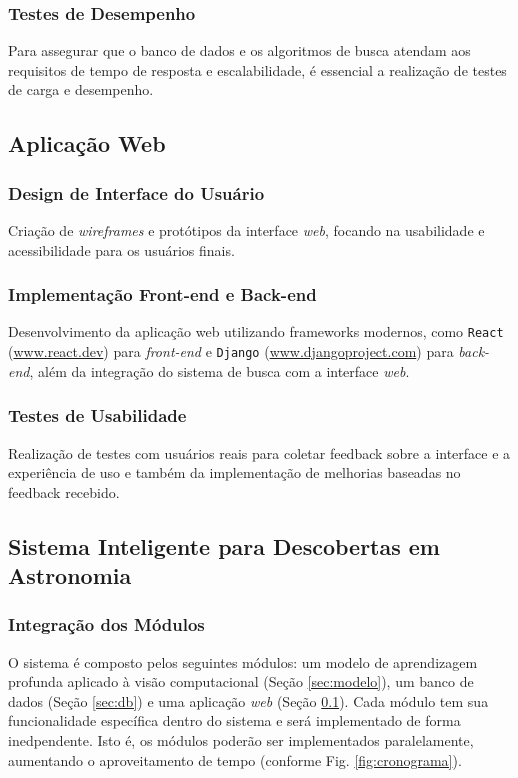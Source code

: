 \documentclass[a4,12pt]{horizon-theme}
\begin{document}
\subsubsection{Testes de Desempenho}
Para assegurar que o banco de dados e os algoritmos de busca atendam aos requisitos de tempo de resposta e escalabilidade, é essencial a realização de testes de carga e desempenho.


\subsection{Aplicação Web}
\label{sec:webapp}
\subsubsection{Design de Interface do Usuário}
Criação de \emph{wireframes} e protótipos da interface \emph{web}, focando na usabilidade e acessibilidade para os usuários finais.

\subsubsection{Implementação Front-end e Back-end}
Desenvolvimento da aplicação web utilizando frameworks modernos, como \texttt{React} (\url{www.react.dev}) para \emph{front-end} e \texttt{Django} (\url{www.djangoproject.com}) para \emph{back-end}, além da integração do sistema de busca com a interface \emph{web}.

\subsubsection{Testes de Usabilidade}
Realização de testes com usuários reais para coletar feedback sobre a interface e a experiência de uso e também da implementação de melhorias baseadas no feedback recebido.





\subsection{Sistema Inteligente para Descobertas em Astronomia}
\label{sec:sistema_inteligente}
\subsubsection{Integração dos Módulos}
\label{sec:integracao}
O sistema é composto pelos seguintes módulos: um modelo de aprendizagem profunda aplicado à visão computacional (Seção \ref{sec:modelo}), um banco de dados (Seção \ref{sec:db}) e uma aplicação \emph{web} (Seção \ref{sec:webapp}). Cada módulo tem sua funcionalidade específica dentro do sistema e será implementado de forma inedpendente. Isto é, os módulos poderão ser implementados paralelamente, aumentando o aproveitamento de tempo (conforme Fig. \ref{fig:cronograma}).
\end{document}
